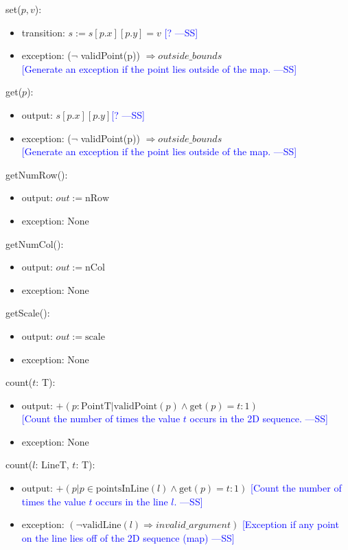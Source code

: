 \documentclass[12pt]{article}
\newcommand{\authornote}[3]{\textcolor{#1}{[#3 ---#2]}}
\newcommand{\authornote}[3]{}
\newcommand{\wss}[1]{\authornote{blue}{SS}{#1}}
\begin{document}
\noindent set($p, v$):
\begin{itemize}
\item transition: $s := s[p.x][p.y] = v$ \wss{?}
\item exception: ($\lnot$ validPoint(p)) $\Rightarrow outside\_bounds$ \\ \wss{Generate an exception if the point lies outside of the
    map.}
\end{itemize}

\noindent get($p$):
\begin{itemize}
\item output: $s[p.x][p.y]$\wss{?}
\item exception: ($\lnot$ validPoint(p)) $\Rightarrow outside\_bounds$ \\ \wss{Generate an exception if the point lies outside of the
    map.}
\end{itemize}

\noindent getNumRow():
\begin{itemize}
\item output: $out := \mbox{nRow}$
\item exception: None
\end{itemize}

\noindent getNumCol():
\begin{itemize}
\item output: $out := \mbox{nCol}$
\item exception: None
\end{itemize}

\noindent getScale():
\begin{itemize}
\item output: $out := \mbox{scale}$
\item exception: None
\end{itemize}

\noindent count($t$: T):
\begin{itemize}
\item output: $+(p : \mbox{PointT}| \mbox{validPoint}(p) \land \mbox{get}(p) = t : 1)$ \\ \wss{Count the number of times the value $t$ occurs in the 2D
    sequence.}
\item exception: None
\end{itemize}

\noindent count($l$: LineT, $t$: T):
\begin{itemize}
\item output: $+(p | p \in \mbox{pointsInLine}(l) \land \mbox{get}(p) = t : 1)$ \wss{Count the number of times the value $t$ occurs in the line
    $l$.}
\item exception: $(\lnot \mbox{validLine}(l) \Rightarrow invalid\_argument)$ \wss{Exception if any point on the line lies off of the 2D
    sequence (map)}
\end{itemize}
\end{document}
